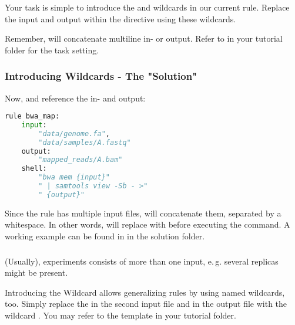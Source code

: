\begin{frame}[fragile]
	\frametitle{}
	\begin{task}
	   Your task is simple to introduce the  and   wildcards in our current  rule. Replace the input and output within the  directive using these wildcards.
	\end{task}
    \begin{hint}
       Remember, \Snakemake{} will concatenate multiline in- or output. Refer to   in your tutorial folder for the task setting.
    \end{hint}
\end{frame}

\begin{frame}[fragile]
  \frametitle{Introducing Wildcards - The "Solution"}
  Now,  and  reference the in- and output:
  \begin{lstlisting}[language=Python,style=Python]
rule bwa_map:
    input:
        "data/genome.fa",
        "data/samples/A.fastq"
    output:
        "mapped_reads/A.bam"
    shell:
        "bwa mem {input}"
        " | samtools view -Sb - >"
        " {output}"
    \end{lstlisting}
    Since the rule has multiple input files, \Snakemake{} will concatenate them, separated by a whitespace. In other words, \Snakemake{} will replace  with  before executing the command.\newline
    A working example can be found in  in the solution folder.
\end{frame}

\begin{frame}[fragile]
  \frametitle{}
  (Usually), experiments consists of more than one input, e.\,g. several replicas might be present.\newline
  \begin{task}{Introducing the  Wildcard}
    \Snakemake{} allows generalizing rules by using named wildcards, too. Simply replace the  in the second input file and in the output file with the wildcard .\newline
    You may refer to the  template in your tutorial folder.
  \end{task}
\end{frame}

